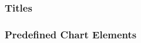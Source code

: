 \documentclass[ aspectratio=169,  12pt,blue,xcolor=pdftex,dvipsnames,table,handout,notes]{beamer}
\begin{document}
		\begin{frame}[t]
		\frametitle{Titles}



		\end{frame}


		\begin{frame}[t]
		\frametitle{Predefined Chart Elements}


		\end{frame}
\end{document}
